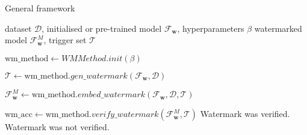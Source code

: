 \begin{algorithm}[H]
\caption{General framework}\label{algo:framework}
\begin{algorithmic}[1]
\REQUIRE dataset $\mathcal{D}$, initialised or pre-trained model $\mathcal{F}_{\mathbf{w}}$, hyperparameters $\beta$
\ENSURE watermarked model $\mathcal{F}_{\mathbf{w}}^{M}$, trigger set $\mathcal{T}$

\STATE $\mathrm{wm\_method} \gets WMMethod.init(\beta)$

\STATE $\mathcal{T} \gets \mathrm{wm\_method}.gen\_watermark(\mathcal{F}_{\mathbf{w}}, \mathcal{D})$

\STATE $\mathcal{F}_{\mathbf{w}}^{M} \gets \mathrm{wm\_method}.embed\_watermark(\mathcal{F}_{\mathbf{w}}, \mathcal{D}, \mathcal{T})$

\STATE $\mathrm{wm\_acc} \gets \mathrm{wm\_method}.verify\_watermark(\mathcal{F}_{\mathbf{w}}^{M}, \mathcal{T})$
    \PRINT Watermark was verified.
\ELSE 
    \PRINT Watermark was not verified.
\ENDIF
\end{algorithmic}
\end{algorithm}